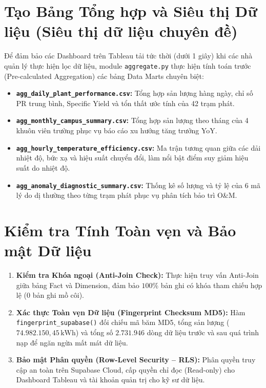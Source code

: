 \documentclass[12pt, a4paper]{report}
\begin{document}
\section{Tạo Bảng Tổng hợp và Siêu thị Dữ liệu (Siêu thị dữ liệu chuyên đề)}
\label{sec:data_marts}

Để đảm bảo các Dashboard trên Tableau tải tức thời (dưới 1 giây) khi các nhà quản lý thực hiện lọc dữ liệu, module \texttt{aggregate.py} thực hiện tính toán trước (Pre-calculated Aggregation) các bảng Data Marts chuyên biệt:

\begin{itemize}[noitemsep]
    \item \textbf{\texttt{agg\_daily\_plant\_performance.csv}:} Tổng hợp sản lượng hàng ngày, chỉ số PR trung bình, Specific Yield và tổn thất ước tính của 42 trạm phát.
    \item \textbf{\texttt{agg\_monthly\_campus\_summary.csv}:} Tổng hợp sản lượng theo tháng của 4 khuôn viên trường phục vụ báo cáo xu hướng tăng trưởng YoY.
    \item \textbf{\texttt{agg\_hourly\_temperature\_efficiency.csv}:} Ma trận tương quan giữa các dải nhiệt độ, bức xạ và hiệu suất chuyển đổi, làm nổi bật điểm suy giảm hiệu suất do nhiệt độ.
    \item \textbf{\texttt{agg\_anomaly\_diagnostic\_summary.csv}:} Thống kê số lượng và tỷ lệ của 6 mã lý do dị thường theo từng trạm phát phục vụ phân tích bảo trì O\&M.
\end{itemize}

\section{Kiểm tra Tính Toàn vẹn và Bảo mật Dữ liệu}
\label{sec:integrity_security}

\begin{enumerate}[noitemsep]
    \item \textbf{Kiểm tra Khóa ngoại (Anti-Join Check):} Thực hiện truy vấn Anti-Join giữa bảng Fact và Dimension, đảm bảo $100\%$ bản ghi có khóa tham chiếu hợp lệ (0 bản ghi mồ côi).
    \item \textbf{Xác thực Toàn vẹn Dữ liệu (Fingerprint Checksum MD5):} Hàm \texttt{fingerprint\_supabase()} đối chiếu mã băm MD5, tổng sản lượng ($74.982.150{,}45\,\text{kWh}$) và tổng số $2.731.946$ dòng dữ liệu trước và sau quá trình nạp để ngăn ngừa mất mát dữ liệu.
    \item \textbf{Bảo mật Phân quyền (Row-Level Security -- RLS):} Phân quyền truy cập an toàn trên Supabase Cloud, cấp quyền chỉ đọc (Read-only) cho Dashboard Tableau và tài khoản quản trị cho kỹ sư dữ liệu.
\end{enumerate}
\end{document}
